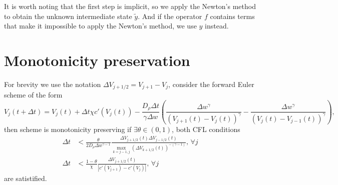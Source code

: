 \documentclass{article}
\begin{document}
  It is worth noting that the first step is implicit, so we apply the Newton's method to obtain
  the unknown intermediate state $\tilde y$. And if the operator $f$ contains terms that make
  it impossible to apply the Newton's method, we use $y$ instead.

  \section{Monotonicity preservation}
  For brevity we use the notation $\Delta V_{j + 1 / 2} = V_{j + 1} - V_j$,
  consider the forward Euler scheme of the form
  \begin{equation}
    \label{eq:Euler scheme}
    V_j(t + \Delta t) = V_j(t)
    + \Delta t\chi c'(V_j(t))
    - \frac{D_\rho\Delta t}{\gamma\Delta w}\left(\frac{\Delta w^\gamma}{(V_{j + 1}(t) - V_j(t))^\gamma}
      - \frac{\Delta w^\gamma}{(V_j(t) - V_{j - 1}(t))^\gamma}\right),
  \end{equation}
  then scheme is monotonicity preserving if $\exists\theta \in (0, 1)$, both CFL conditions
  \begin{subequations}
    \begin{align}
      \label{eq:CFL diffusion}
      \Delta t &< \frac{\theta}{2D_\rho \Delta w^{\gamma - 1}}
        \frac{\Delta V_{j + 1 / 2}(t)\Delta V_{j - 1 / 2}(t)}
          {\max_{k = j - 1, j}\left(\Delta V_{k + 1 / 2}(t)\right)^{-(\gamma - 1)}},
      \,\forall j \\
      \label{eq:CFL chemo}
      \Delta t &< \frac{1 - \theta}{\chi}\frac{\Delta V_{j + 1 / 2}(t)}{\left|c'(V_{j + 1}) - c'(V_j)\right|},
      \,\forall j
    \end{align}
  \end{subequations}
  are satistified.
\end{document}
